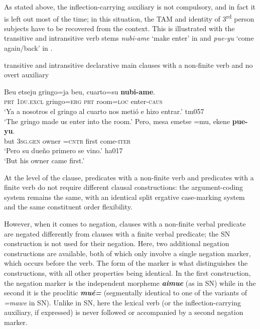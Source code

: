 \documentclass[output=paper,draft,draftmode,colorlinks,citecolor=brown]{langscibook}
\begin{document}
As stated above, the inflection-carrying auxiliary is not compulsory, and
in fact it is left out most of the time; in this situation, the TAM and
identity of 3\textsuperscript{rd} person subjects have to be recovered from
the context. This is illustrated with the transitive and intransitive verb
stems \textit{nubi-ame} `make enter' in  and
\textit{pue-yu} `come again\slash back' in
.

\begin{exe}\ex \label{ex:tacana-infinite-gringo-owner}  transitive and intransitive declarative main clauses with a non-finite verb and no overt auxiliary
\begin{xlist}
\ex\label{ex:tacana-infinite-gringo}
\gll  Beu  etseju
gringo=ja  beu,  cuarto=su
\textbf{nubi-ame}.
\\
    \textsc{prt} \textsc{1du.excl} gringo=\textsc{erg} \textsc{prt}
    room=\textsc{loc}  enter-\textsc{caus}\\
\glt `Ya a nosotros el gringo al cuarto nos metió e hizo entrar.' tm057\\
`The gringo made us enter into the room.'
\ex\label{ex:tacana-infinite-owner}
\gll Pero, mesa
emetse{\cb} =mu, ekene
\textbf{pue-yu}.\\
    but  \textsc{3sg.gen}  owner  =\textsc{cntr}  first
    come-\textsc{iter}\\
\glt `Pero su dueño primero se vino.' ha017\\
`But his owner came first.'
\end{xlist}\end{exe}

At the level of the clause, predicates with a non-finite verb and predicates with a finite verb do not require different clausal constructions: the argument-coding system remains the same, with an identical split ergative case-marking system and the same constituent order flexibility.

However, when it comes to negation, clauses with a non-finite verbal
predicate are negated differently from clauses with a finite verbal
predicate; the SN construction is not used for their negation. Here, two
additional negation constructions are available, both of which only involve
a single negation marker, which occurs before the verb. The form of the
marker is what distinguishes the constructions, with all other properties
being identical. In the first construction, the negation marker is the
independent morpheme \textbf{\textit{aimue}} (as in SN) while in the
second it is the proclitic \textbf{\textit{mué=}} (segmentally identical
to one of the variants of \textit{=mawe} in SN). Unlike in SN, here the
lexical verb (or the inflection-carrying auxiliary, if expressed) is never
followed or accompanied by a second negation marker.
\end{document}

